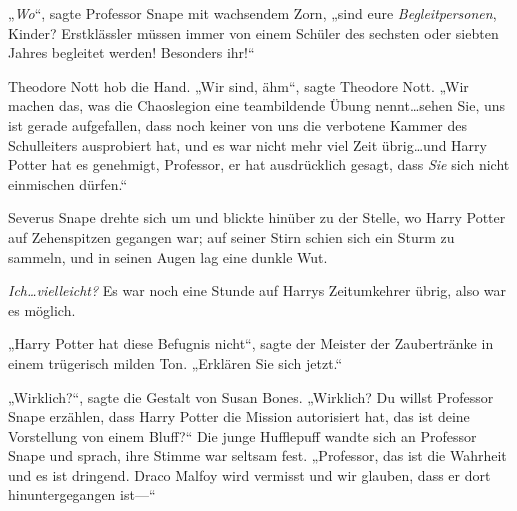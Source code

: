 „\emph{Wo}“, sagte Professor Snape mit wachsendem Zorn, „sind eure \emph{Begleitpersonen}, Kinder? Erstklässler müssen immer von einem Schüler des sechsten oder siebten Jahres begleitet werden! Besonders ihr!“

Theodore Nott hob die Hand. „Wir sind, ähm“, sagte Theodore Nott.
„Wir machen das, was die Chaoslegion eine teambildende Übung nennt…sehen Sie, uns ist gerade aufgefallen, dass noch keiner von uns die verbotene Kammer des Schulleiters ausprobiert hat, und es war nicht mehr viel Zeit übrig…und Harry Potter hat es genehmigt, Professor, er hat ausdrücklich gesagt, dass \emph{Sie} sich nicht einmischen dürfen.“

Severus Snape drehte sich um und blickte hinüber zu der Stelle, wo Harry Potter auf Zehenspitzen gegangen war; auf seiner Stirn schien sich ein Sturm zu sammeln, und in seinen Augen lag eine dunkle Wut.

\emph{Ich…vielleicht?}
Es war noch eine Stunde auf Harrys Zeitumkehrer übrig, also war es möglich.

„Harry Potter hat diese Befugnis nicht“, sagte der Meister der Zaubertränke in einem trügerisch milden Ton. „Erklären Sie sich jetzt.“

„Wirklich?“, sagte die Gestalt von Susan Bones. „Wirklich? Du willst Professor Snape erzählen, dass Harry Potter die Mission autorisiert hat, das ist deine Vorstellung von einem Bluff?“ Die junge Hufflepuff wandte sich an Professor Snape und sprach, ihre Stimme war seltsam fest.
„Professor, das ist die Wahrheit und es ist dringend. Draco Malfoy wird vermisst und wir glauben, dass er dort hinuntergegangen ist—“

